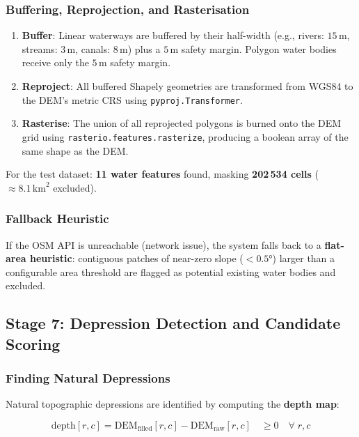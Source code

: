 \documentclass[12pt,a4paper]{article}
\begin{document}
\subsubsection{Buffering, Reprojection, and Rasterisation}

\begin{enumerate}
    \item \textbf{Buffer}: Linear waterways are buffered by their half-width
          (e.g., rivers: $15\,\text{m}$, streams: $3\,\text{m}$, canals: $8\,\text{m}$)
          plus a $5\,\text{m}$ safety margin. Polygon water bodies receive only the
          $5\,\text{m}$ safety margin.
    \item \textbf{Reproject}: All buffered Shapely geometries are transformed from
          WGS84 to the DEM's metric CRS using \texttt{pyproj.Transformer}.
    \item \textbf{Rasterise}: The union of all reprojected polygons is burned onto the
          DEM grid using \texttt{rasterio.features.rasterize}, producing a boolean
          array of the same shape as the DEM.
\end{enumerate}

For the test dataset: \textbf{11 water features} found, masking \textbf{202\,534 cells}
($\approx 8.1\,\text{km}^2$ excluded).

\subsubsection{Fallback Heuristic}
If the OSM API is unreachable (network issue), the system falls back to a
\textbf{flat-area heuristic}: contiguous patches of near-zero slope
($< 0.5°$) larger than a configurable area threshold are flagged as
potential existing water bodies and excluded.

\subsection{Stage 7: Depression Detection and Candidate Scoring}

\subsubsection{Finding Natural Depressions}
Natural topographic depressions are identified by computing the \textbf{depth map}:

\begin{equation}
    \text{depth}[r,c] = \text{DEM}_{\text{filled}}[r,c] - \text{DEM}_{\text{raw}}[r,c]
    \quad \geq 0 \quad \forall\; r,c
\end{equation}
\end{document}
